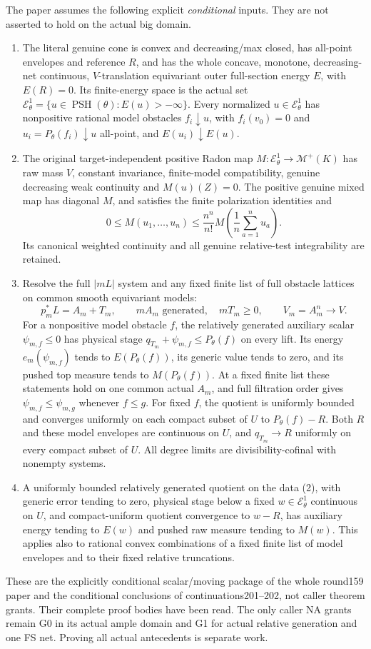 \documentclass[11pt]{article}
\newcommand{\PSH}{\operatorname{PSH}}
\newcommand{\EE}{\mathcal E^1_\theta}
\begin{document}
The paper assumes the following explicit \emph{conditional} inputs.
They are not asserted to hold on the actual big domain.
\begin{enumerate}
\item[(S)] The literal genuine cone is convex and decreasing/max closed,
has all-point envelopes and reference $R$, and has the whole concave,
monotone, decreasing-net continuous, $V$-translation equivariant
outer full-section energy $E$, with $E(R)=0$.
Its finite-energy space is the actual set
$\EE=\{u\in\PSH(\theta):E(u)>-\infty\}$.
Every normalized $u\in\EE$ has nonpositive rational model obstacles
$f_i\downarrow u$, with $f_i(v_0)=0$ and
$u_i=P_\theta(f_i)\downarrow u$ all-point, and
$E(u_i)\downarrow E(u)$.
\item[(M)] The original target-independent positive Radon map
$M:\EE\to\mathcal M^+(K)$ has raw mass $V$, constant invariance,
finite-model compatibility, genuine decreasing weak continuity
and $M(u)(Z)=0$.
The positive genuine mixed map has diagonal $M$, and satisfies
the finite polarization identities and
\[
 0\leq M(u_1,\ldots,u_n)
 \leq \frac{n^n}{n!}M\!\left(\frac1n\sum_{a=1}^n u_a\right).
                                                        \tag{1}
\]
Its canonical weighted continuity and all genuine relative-test
integrability are retained.
\item[(F)] Resolve the full $|mL|$ system and any fixed finite list of
full obstacle lattices on common smooth equivariant models:
\[
 p_m^*L=A_m+T_m,\qquad mA_m\text{ generated},\quad mT_m\geq0,
 \qquad V_m=A_m^n\longrightarrow V.                      \tag{2}
\]
For a nonpositive model obstacle $f$, the relatively generated
auxiliary scalar $\psi_{m,f}\leq0$ has physical stage
$q_{T_m}+\psi_{m,f}\leq P_\theta(f)$ on every lift.
Its energy $e_m(\psi_{m,f})$ tends to $E(P_\theta(f))$,
its generic value tends to zero, and its pushed top measure tends
to $M(P_\theta(f))$.
At a fixed finite list these statements hold on one common actual
$A_m$, and full filtration order gives
$\psi_{m,f}\leq\psi_{m,g}$ whenever $f\leq g$.
 For fixed $f$, the quotient is uniformly bounded and converges
 uniformly on each compact subset of $U$ to $P_\theta(f)-R$.
 Both $R$ and these model envelopes are continuous on $U$, and
 $q_{T_m}\to R$ uniformly on every compact subset of $U$.
 All degree limits are divisibility-cofinal with nonempty systems.
\item[(B)] A uniformly bounded relatively generated quotient on
the data (2), with generic error tending to zero, physical stage
below a fixed $w\in\EE$ continuous on $U$, and compact-uniform
quotient convergence to $w-R$, has auxiliary energy tending to
$E(w)$ and pushed raw measure tending to $M(w)$.
This applies also to rational convex combinations of a fixed finite
list of model envelopes and to their fixed relative truncations.
\end{enumerate}
These are the explicitly conditional scalar/moving package of
the whole round159 paper and the conditional conclusions of
continuations201--202, not caller theorem grants. Their complete
proof bodies have been read. The only caller NA grants remain
G0 in its actual ample domain and G1 for actual relative generation
and one FS net. Proving all actual antecedents is separate work.
\end{document}
